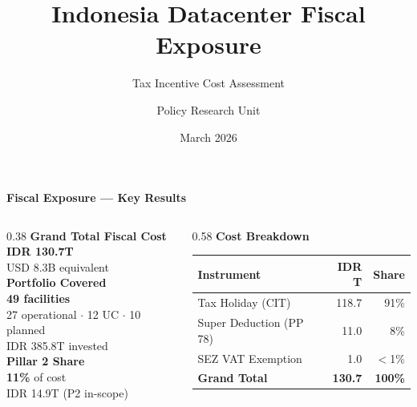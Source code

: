 \documentclass[aspectratio=169,10pt]{beamer}
\title{\textbf{Indonesia Datacenter Fiscal Exposure}}
\subtitle{Tax Incentive Cost Assessment}
\author{Policy Research Unit}
\date{March 2026}
\begin{document}
\begin{frame}
\titlepage
\end{frame}

\begin{frame}{\textbf{Fiscal Exposure — Key Results}}
\vspace{0.3cm}

\begin{columns}[T]
  \begin{column}{0.38\textwidth}
    \centering
    \vspace{0.2cm}
    {\footnotesize\textbf{Grand Total Fiscal Cost}}\\[4pt]
    {\Huge\color{crimson}\textbf{IDR 130.7T}}\\[4pt]
    {\footnotesize USD 8.3B equivalent}\\[14pt]

    {\footnotesize\textbf{Portfolio Covered}}\\[4pt]
    {\large\color{navyblue}\textbf{49 facilities}}\\
    {\footnotesize 27 operational $\cdot$ 12 UC $\cdot$ 10 planned}\\
    {\footnotesize IDR 385.8T invested}\\[14pt]

    {\footnotesize\textbf{Pillar 2 Share}}\\[4pt]
    {\large\color{navyblue}\textbf{11\%}} {\footnotesize of cost}\\
    {\footnotesize IDR 14.9T (P2 in-scope)}
  \end{column}

  \begin{column}{0.58\textwidth}
    \centering
    {\footnotesize\textbf{Cost Breakdown}}\\[6pt]
    \begin{tabular}{lrr}
      \toprule
      \rowcolor{navyblue}\color{white}\textbf{Instrument} & \color{white}\textbf{IDR T} & \color{white}\textbf{Share}\\
      \midrule
      \rowcolor{lightgray} Tax Holiday (CIT) & 118.7 & 91\% \\
      Super Deduction (PP 78) & 11.0 & 8\% \\
      \rowcolor{lightgray} SEZ VAT Exemption & 1.0 & $<$1\% \\
      \midrule
      \rowcolor{navyblue}\color{white}\textbf{Grand Total} & \color{white}\textbf{130.7} & \color{white}\textbf{100\%} \\
      \bottomrule
    \end{tabular}\\[12pt]


\end{column}
\end{columns}
\end{frame}
\end{document}
